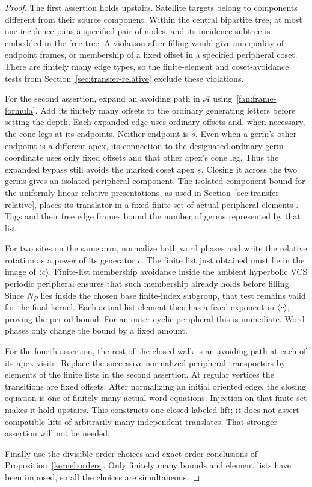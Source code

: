 \begin{proof}
The first assertion holds upstairs.  Satellite targets belong to
components different from their source component.  Within the central
bipartite tree, at most one incidence joins a specified pair of nodes,
and its incidence subtree is embedded in the free tree.  A violation
after filling would give an equality of endpoint frames, or membership
of a fixed offset in a specified peripheral coset.  There are finitely
many edge types, so the finite-element and coset-avoidance tests from
Section~\ref{sec:transfer-relative} exclude these violations.

For the second assertion, expand an avoiding path in $\mathcal A$
using~\eqref{fan:frame-formula}.  Add its finitely many offsets to the
ordinary generating letters before setting the depth.  Each expanded
edge uses ordinary offsets and, when necessary, the cone legs at its
endpoints.  Neither endpoint is $s$.  Even when a germ's other endpoint
is a different apex, its connection to the designated ordinary germ
coordinate uses only fixed offsets and that other apex's cone leg.
Thus the expanded bypass still avoids the marked coset apex $s$.
Closing it across the two germs gives an isolated peripheral component.
The isolated-component bound for the uniformly linear relative
presentations, as used in Section~\ref{sec:transfer-relative}, places its
translator in a fixed finite set of actual peripheral elements
\cite{Osin2006,Osin2007}.  Tags and their free edge frames bound the
number of germs represented by that list.

For two sites on the same arm, normalize both word phases and write
the relative rotation as a power of its generator $c$.  The finite list
just obtained must lie in the image of $\langle c\rangle$.
Finite-list membership avoidance inside the ambient hyperbolic VCS
periodic peripheral ensures that such membership already holds before
filling.  Since $N_P$ lies inside the chosen base finite-index subgroup,
that test remains valid for the final kernel.  Each actual list element
then has a fixed exponent in $\langle c\rangle$, proving the period
bound.  For an outer cyclic peripheral this is immediate.  Word phases
only change the bound by a fixed amount.

For the fourth assertion, the rest of the closed walk is an avoiding
path at each of its apex visits.  Replace the successive normalized
peripheral transporters by elements of the finite lists in the second
assertion.  At regular vertices the transitions are fixed offsets.
After normalizing an initial oriented edge, the closing equation is
one of finitely many actual word equations.  Injection on that finite
set makes it hold upstairs.  This constructs one closed labeled lift;
it does not assert compatible lifts of arbitrarily many independent
translates.  That stronger assertion will not be needed.

Finally use the divisible order choices and exact order conclusions
of Proposition~\ref{kernel:orders}.  Only finitely many bounds and element
lists have been imposed, so all the choices are simultaneous.
\end{proof}

